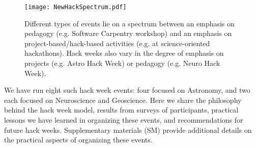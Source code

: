 
\begin{figure}
\begin{center}
\texttt{[image: NewHackSpectrum.pdf]}
\caption{Different types of events lie on a spectrum between an emphasis on pedagogy (e.g. Software Carpentry workshop) and an emphasis on project-based/hack-based activities (e.g. at science-oriented hackathons). Hack weeks also vary in the degree of emphasis on projects (e.g. Astro Hack Week) or pedagogy (e.g. Neuro Hack Week).}
\label{fig:hackspectrum}
\end{center}
\end{figure}

We have run eight such hack week events: four focused on Astronomy, and two each focused on Neuroscience and Geoscience.
Here we share the philosophy behind the hack week model, results from surveys of participants, practical lessons we have learned in organizing these events, and recommendations for future hack weeks. Supplementary materials (SM) provide additional details on the practical aspects of organizing these events.
